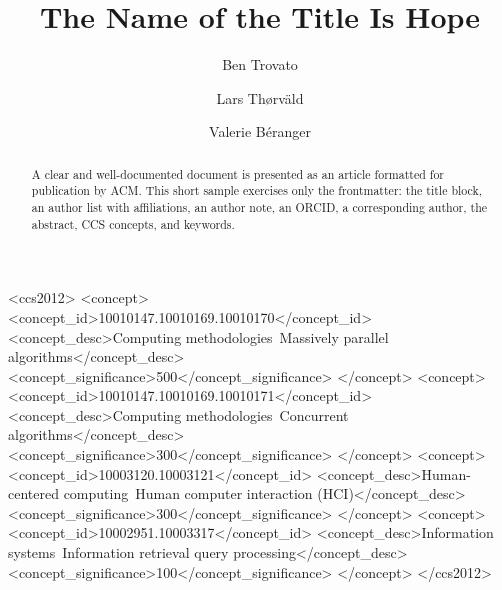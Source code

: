 \documentclass[acmsmall]{acmart}
\begin{document}
\title{The Name of the Title Is Hope}

\author{Ben Trovato}

\author{Lars Th{\o}rv{\"a}ld}
\correspondingauthor
{}

\author{Valerie B\'eranger}

\renewcommand{\shortauthors}{Trovato et al.}

\begin{abstract}
  A clear and well-documented document is presented as an article formatted for
  publication by ACM. This short sample exercises only the frontmatter: the
  title block, an author list with affiliations, an author note, an ORCID, a
  corresponding author, the abstract, CCS concepts, and keywords.
\end{abstract}

\begin{CCSXML}
<ccs2012>
 <concept>
  <concept_id>10010147.10010169.10010170</concept_id>
  <concept_desc>Computing methodologies~Massively parallel algorithms</concept_desc>
  <concept_significance>500</concept_significance>
 </concept>
 <concept>
  <concept_id>10010147.10010169.10010171</concept_id>
  <concept_desc>Computing methodologies~Concurrent algorithms</concept_desc>
  <concept_significance>300</concept_significance>
 </concept>
 <concept>
  <concept_id>10003120.10003121</concept_id>
  <concept_desc>Human-centered computing~Human computer interaction (HCI)</concept_desc>
  <concept_significance>300</concept_significance>
 </concept>
 <concept>
  <concept_id>10002951.10003317</concept_id>
  <concept_desc>Information systems~Information retrieval query processing</concept_desc>
  <concept_significance>100</concept_significance>
 </concept>
</ccs2012>
\end{CCSXML}

\end{document}
